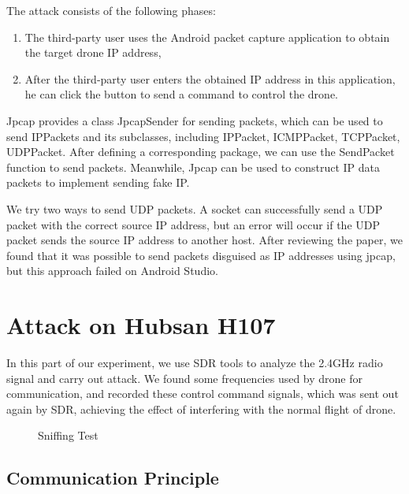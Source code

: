 \documentclass{acm_proc_article-sp}
\begin{document}
The attack consists of the following phases:

\begin{enumerate}
  \item The third-party user uses the Android packet capture application to obtain the target drone IP address,
  \item After the third-party user enters the obtained IP address in this application, he can click the button to send a command to control the drone.
\end{enumerate}


Jpcap provides a class JpcapSender for sending packets, which can be used to send IPPackets and its subclasses, including IPPacket, ICMPPacket, TCPPacket, UDPPacket\cite{jpcap}. After defining a corresponding package, we can use the SendPacket function to send packets. Meanwhile, Jpcap can be used to construct IP data packets to implement sending fake IP.

We try two ways to send UDP packets. A socket can successfully send a UDP packet with the correct source IP address, but an error will occur if the UDP packet sends the source IP address to another host. After reviewing the paper, we found that it was possible to send packets disguised as IP addresses using jpcap, but this approach failed on Android Studio.


\section{Attack on Hubsan H107}

 In this part of our experiment, we use SDR tools to analyze the 2.4GHz radio signal and carry out attack. We found some frequencies used by drone for communication, and recorded these control command signals, which was sent out again by SDR, achieving the effect of interfering with the normal flight of drone.
 
\begin{figure}
\centering
{}
\caption{Sniffing Test}
\label{sniff}
\end{figure}

\subsection{Communication Principle}
\end{document}
